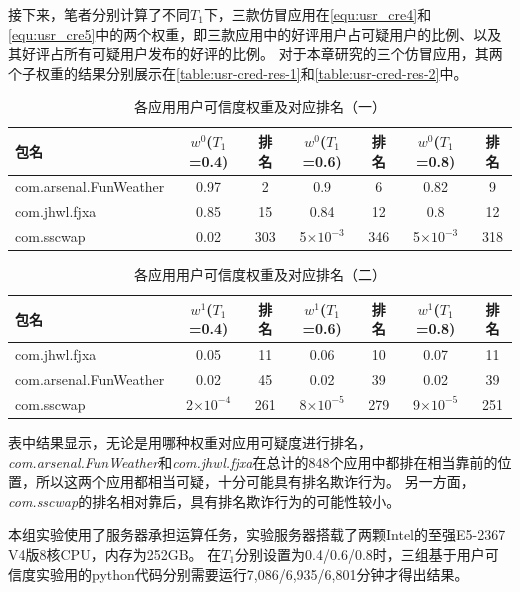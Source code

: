接下来，笔者分别计算了不同$T_1$下，三款仿冒应用在\autoref{equ:usr_cre4}和\autoref{equ:usr_cre5}中的两个权重，即三款应用中的好评用户占可疑用户的比例、以及其好评占所有可疑用户发布的好评的比例。
对于本章研究的三个仿冒应用，其两个子权重的结果分别展示在\autoref{table:usr-cred-res-1}和\autoref{table:usr-cred-res-2}中。

\begin{table}[htbp]
	\renewcommand{\arraystretch}{1}
	\small
	\centering
	\caption{各应用用户可信度权重及对应排名（一）}
	\vspace{1mm}
	\begin{tabular}{lcccccc}
		\toprule
		包名 & $w^0$($T_1$=0.4) & 排名 & $w^0$($T_1$=0.6) & 排名 & $w^0$($T_1$=0.8) & 排名 \\
		\midrule
		com.arsenal.FunWeather & 0.97 & 2 & 0.9 & 6 & 0.82 & 9 \\
		\rowcolor{gray!15} com.jhwl.fjxa & 0.85 & 15 & 0.84 & 12 & 0.8 & 12 \\
		com.sscwap & 0.02 & 303 & 5$\times10^{-3}$ & 346 & 5$\times10^{-3}$ & 318 \\
		\bottomrule
	\end{tabular}
	\label{table:usr-cred-res-1}
\end{table}

\begin{table}[htbp]
	\renewcommand{\arraystretch}{1}
	\small
	\centering
	\caption{各应用用户可信度权重及对应排名（二）}
	\vspace{1mm}
	\begin{tabular}{lcccccc}
		\toprule
		包名 & $w^1$($T_1$=0.4) & 排名 & $w^1$($T_1$=0.6) & 排名 & $w^1$($T_1$=0.8) & 排名 \\
		\midrule
		com.jhwl.fjxa & 0.05 & 11 & 0.06 & 10 & 0.07 & 11 \\
		\rowcolor{gray!15} com.arsenal.FunWeather & 0.02 & 45 & 0.02 & 39 & 0.02 & 39 \\
		com.sscwap & 2$\times10^{-4}$ & 261 & 8$\times10^{-5}$ & 279 & 9$\times10^{-5}$ & 251 \\
		\bottomrule
	\end{tabular}
	\label{table:usr-cred-res-2}
\end{table}

表中结果显示，无论是用哪种权重对应用可疑度进行排名，\emph{com.arsenal.FunWeather}和\emph{com.jhwl.fjxa}在总计的848个应用中都排在相当靠前的位置，所以这两个应用都相当可疑，十分可能具有排名欺诈行为。
另一方面，\emph{com.sscwap}的排名相对靠后，具有排名欺诈行为的可能性较小。

本组实验使用了服务器承担运算任务，实验服务器搭载了两颗Intel的至强E5-2367 V4版8核CPU，内存为252GB。
在$T_1$分别设置为0.4/0.6/0.8时，三组基于用户可信度实验用的python代码分别需要运行7,086/6,935/6,801分钟才得出结果。

